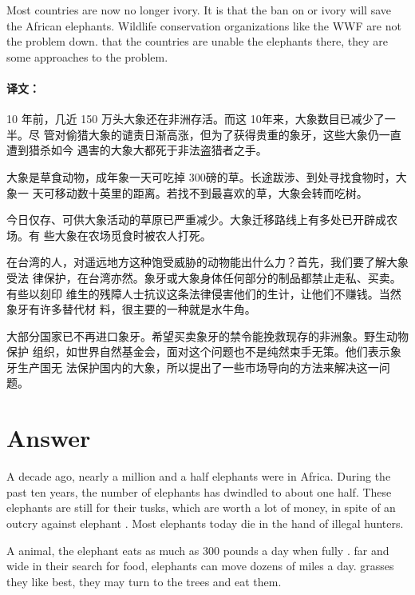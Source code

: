 Most countries are now no longer  ivory. It is 
that the ban on  or  ivory will save the
 African elephants. Wildlife conservation organizations like
the WWF are not  the problem  down. 
that the  countries are unable  the
elephants there, they are  some 
approaches to  the problem.

\paragraph{译文：}


10 年前，几近 150 万头大象还在非洲存活。而这 10年来，大象数目已减少了一半。尽
管对偷猎大象的谴责日渐高涨，但为了获得贵重的象牙，这些大象仍一直遭到猎杀如今
遇害的大象大都死于非法盗猎者之手。

大象是草食动物，成年象一天可吃掉 300磅的草。长途跋涉、到处寻找食物时，大象一
天可移动数十英里的距离。若找不到最喜欢的草，大象会转而吃树。

今日仅存、可供大象活动的草原已严重减少。大象迁移路线上有多处已开辟成农场。有
些大象在农场觅食时被农人打死。

在台湾的人，对遥远地方这种饱受威胁的动物能出什么力？首先，我们要了解大象受法
律保护，在台湾亦然。象牙或大象身体任何部分的制品都禁止走私、买卖。有些以刻印
维生的残障人士抗议这条法律侵害他们的生计，让他们不赚钱。当然象牙有许多替代材
料，很主要的一种就是水牛角。

大部分国家已不再进口象牙。希望买卖象牙的禁令能挽救现存的非洲象。野生动物保护
组织，如世界自然基金会，面对这个问题也不是纯然束手无策。他们表示象牙生产国无
法保护国内的大象，所以提出了一些市场导向的方法来解决这一问题。

\section{Answer}

A decade ago, nearly a million and a half elephants were  in
Africa. During the past ten years, the number of elephants has dwindled to
about one half. These elephants are still   for
their tusks, which are worth a lot of money, in spite of an
 outcry against elephant . Most elephants
 today die in the hand of illegal hunters.

A  animal, the elephant eats as much as 300 pounds a
day when fully .  far and wide in their search
for food, elephants can move dozens of miles a day.   grasses they like best, they may turn to the trees and eat them.

